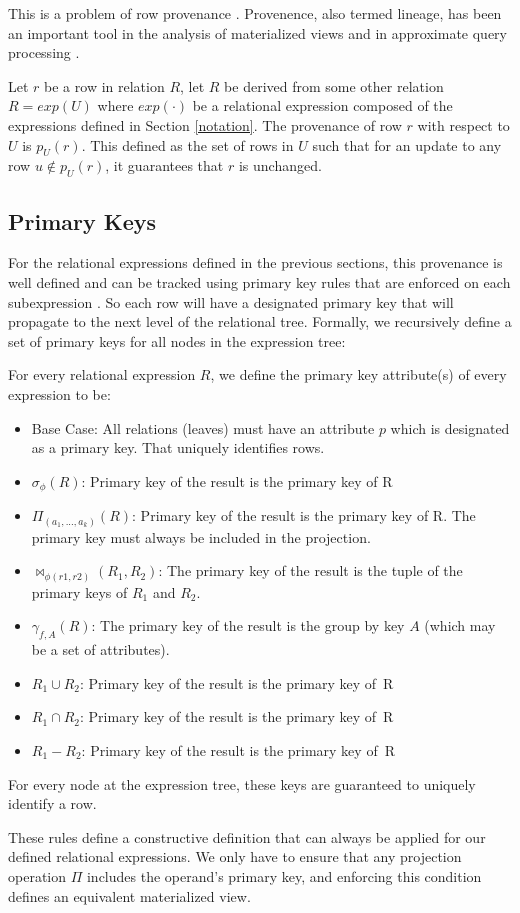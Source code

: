 This is a problem of row provenance \cite{DBLP:journals/vldb/CuiW03}.
Provenence, also termed lineage, has been an important tool in the analysis of materialized views \cite{DBLP:journals/vldb/CuiW03} and in approximate query processing \cite{DBLP:conf/sigmod/ZengGMZ14}.
\begin{definition}[Provenance]\label{prov}
Let $r$ be a row in relation $R$, let $R$ be derived from some other
relation $R = exp(U)$ where $exp(\cdot)$ be a relational
expression composed of the expressions defined in Section \ref{notation}.
The provenance of row $r$ with respect to $U$ is $p_U(r)$. 
This defined as the set of rows in $U$ such that for an update to any row $u \not\in p_U(r)$, it guarantees that $r$ is unchanged.
\end{definition}

\subsection{Primary Keys}
For the relational expressions defined in the previous sections, this provenance is well defined and can be tracked using primary key rules that are enforced on
each subexpression \cite{DBLP:journals/vldb/CuiW03}. 
So each row will have a designated primary key that will propagate to the next level of the relational tree.
Formally, we recursively define a set of primary keys for all nodes in the expression tree:
\begin{definition} 
For every relational expression $R$, we define the primary key attribute(s) of every expression to be:
\begin{itemize}[noitemsep]
\item Base Case: All relations (leaves) must have an attribute $p$ which is designated as a primary key. That uniquely identifies rows.
\item $\sigma_{\phi}(R)$: Primary key of the result is the primary key of R 
\item $\Pi_{(a_1,...,a_k)}(R)$: Primary key of the result is the primary key of R. The primary key must always be included in the projection.
\item $\bowtie_{\phi (r1,r2)}(R_1,R_2)$: The primary key of the result is the tuple of the primary keys of $R_1$ and $R_2$. 
\item $\gamma_{f,A}(R)$: The primary key of the result is the group by key $A$ (which may be a set of attributes).
\item $R_1 \cup R_2$: Primary key of the result is the primary key of~R
\item $R_1 \cap R_2$: Primary key of the result is the primary key of~R
\item $R_1 - R_2$: Primary key of the result is the primary key of~R
\end{itemize}
For every node at the expression tree, these keys are guaranteed to uniquely identify a row.
\end{definition}
These rules define a constructive definition that can always be applied for our defined relational expressions. 
We only have to ensure that any projection operation $\Pi$ includes the operand's primary key, and enforcing this condition
defines an equivalent materialized view.

